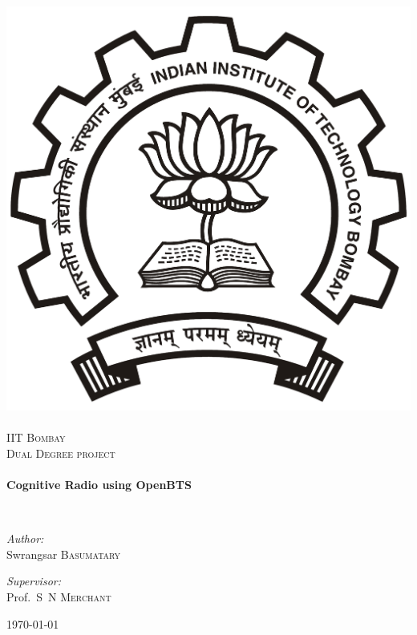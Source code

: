 \begin{titlepage}
\begin{center}

\includegraphics[width=0.27\textheight]{iitbLogo}~\\[1cm]

\textsc{\LARGE IIT Bombay}\\[1.5cm]

\textsc{\Large Dual Degree project}\\[0.5cm]

\HRule \\[0.4cm]
{ \huge \bfseries Cognitive Radio using OpenBTS\\[0.4cm] }

\HRule \\[1.5cm]

\begin{minipage}{0.4\textwidth}
\begin{flushleft} \large
\emph{Author:}\\
Swrangsar \textsc{Basumatary}
\end{flushleft}
\end{minipage}
\begin{minipage}{0.4\textwidth}
\begin{flushright} \large
\emph{Supervisor:} \\
Prof.~S~N \textsc{Merchant}
\end{flushright}
\end{minipage}

\vfill

{\large \today}

\end{center}
\end{titlepage}
